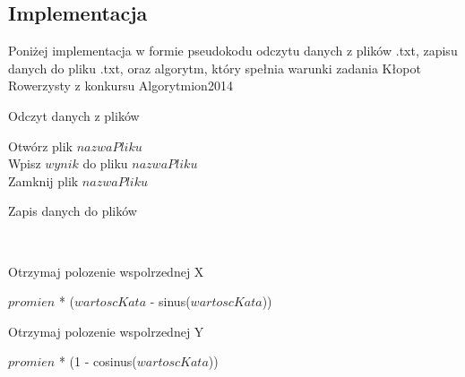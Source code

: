 \documentclass[12pt,a4paper]{article}
\begin{document}
	\subsection*{Implementacja}
Poniżej implementacja w formie pseudokodu odczytu danych z plików .txt, zapisu danych do pliku .txt, oraz algorytm, który spełnia warunki zadania Kłopot Rowerzysty z konkursu Algorytmion2014

	\begin{algorithm}[H]
	\caption{Odczyt danych z plików}
	\end{algorithm}
	
	\BlankLine
	
	\begin{algorithm}[H]
	
	
	\BlankLine
	
	Otwórz plik $nazwaPliku$ \\
	Wpisz $wynik$ do pliku $nazwaPliku$ \\
	Zamknij plik $nazwaPliku$
		\caption{Zapis danych do plików} \\
	\end{algorithm}
	
	\BlankLine
	
	\begin{algorithm}[H]
	\caption{Otrzymaj polozenie wspolrzednej X}
	\BlankLine
	\Return $promien$ * ($wartoscKata$ - sinus($wartoscKata$))
	\end{algorithm}
	
	\BlankLine
	
	\begin{algorithm}[H]
	\caption{Otrzymaj polozenie wspolrzednej Y}
	\BlankLine
	\Return $promien$ * (1 - cosinus($wartoscKata$))
	\end{algorithm}
	
\end{document}
